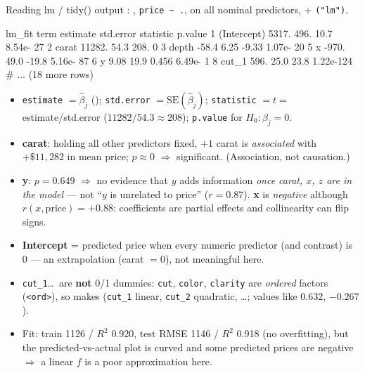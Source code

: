 \begin{topic}{Reading lm / tidy() output}
: , \texttt{price \textasciitilde{} .},  on all nominal predictors,  + \texttt{("lm")}.
\begin{routput}
lm_fit %
  term        estimate std.error statistic   p.value
1 (Intercept)  5317.      496.      10.7   8.54e- 27
2 carat       11282.       54.3    208.    0
3 depth         -58.4       6.25    -9.33  1.07e- 20
5 x            -970.       49.0    -19.8   5.16e- 87
6 y               9.08     19.9      0.456 6.49e-  1
8 cut_1         596.       25.0     23.8   1.22e-124
# ... (18 more rows)
\end{routput}
\begin{itemize}
\item \texttt{estimate} $=\hat\beta_j$ (); \texttt{std.error} $=\mathrm{SE}(\hat\beta_j)$; \texttt{statistic} $=t=$ estimate/std.error ($11282/54.3\approx208$); \texttt{p.value} for $H_0:\beta_j=0$.
\item \textbf{carat}: holding all other predictors fixed, $+1$ carat is \emph{associated} with $+\$11{,}282$ in mean price; $p\approx0$ $\Rightarrow$ significant. (Association, not causation.)
\item \textbf{y}: $p=0.649$ $\Rightarrow$ no evidence that $y$ adds information \emph{once carat, $x$, $z$ are in the model} --- not ``$y$ is unrelated to price'' ($r=0.87$). \textbf{x} is \emph{negative} although $r(x,\text{price})=+0.88$: coefficients are partial effects and collinearity can flip signs.
\item \textbf{Intercept} = predicted price when every numeric predictor (and contrast) is 0 --- an extrapolation (carat $=0$), not meaningful here.
\item \texttt{cut\_1}\ldots\ are \textbf{not} 0/1 dummies: \texttt{cut}, \texttt{color}, \texttt{clarity} are \emph{ordered} factors (\texttt{<ord>}), so  makes  (\texttt{cut\_1} linear, \texttt{cut\_2} quadratic, \ldots; values like 0.632, $-0.267$).
\item Fit: train  1126 / $R^2$ 0.920, test RMSE 1146 / $R^2$ 0.918 (no overfitting), but the predicted-vs-actual plot is curved and some predicted prices are negative $\Rightarrow$ a linear $f$ is a poor approximation here.
\end{itemize}
\end{topic}

